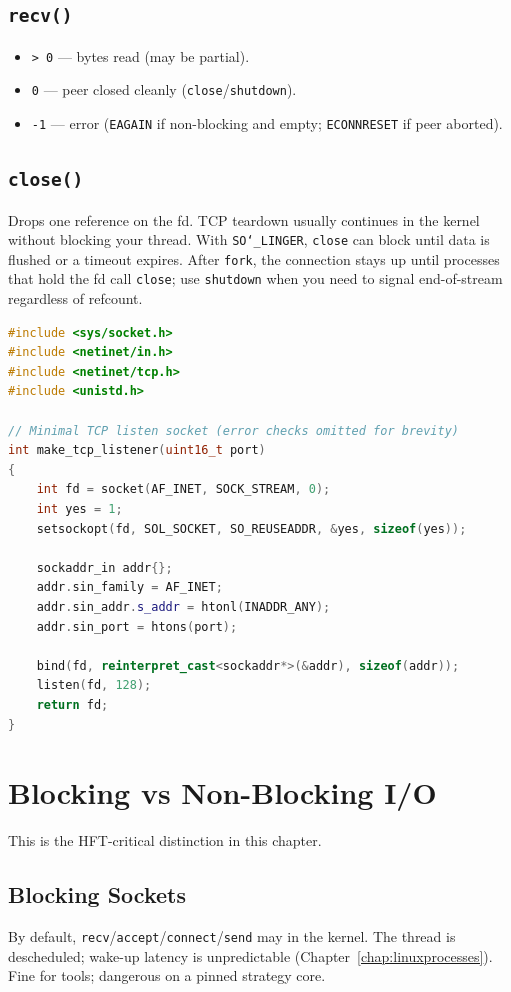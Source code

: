 \subsection{\texttt{recv()}}
\label{subsec:recv}
\begin{itemize}
    \item \texttt{> 0} --- bytes read (may be partial).
    \item \texttt{0} --- peer closed cleanly (\texttt{close}/\texttt{shutdown}).
    \item \texttt{-1} --- error (\texttt{EAGAIN} if non-blocking and empty; \texttt{ECONNRESET} if peer aborted).
\end{itemize}

\subsection{\texttt{close()}}
\label{subsec:close}
Drops one reference on the fd. TCP teardown usually continues in the kernel without 
blocking your thread. With \texttt{SO\char`_LINGER}, \texttt{close} can block until data is flushed 
or a timeout expires. After \texttt{fork}, the connection stays up until  processes 
that hold the fd call \texttt{close}; use \texttt{shutdown} when you need to signal end-of-stream 
regardless of refcount.

\begin{lstlisting}[language=C++]
#include <sys/socket.h>
#include <netinet/in.h>
#include <netinet/tcp.h>
#include <unistd.h>

// Minimal TCP listen socket (error checks omitted for brevity)
int make_tcp_listener(uint16_t port)
{
    int fd = socket(AF_INET, SOCK_STREAM, 0);
    int yes = 1;
    setsockopt(fd, SOL_SOCKET, SO_REUSEADDR, &yes, sizeof(yes));

    sockaddr_in addr{};
    addr.sin_family = AF_INET;
    addr.sin_addr.s_addr = htonl(INADDR_ANY);
    addr.sin_port = htons(port);

    bind(fd, reinterpret_cast<sockaddr*>(&addr), sizeof(addr));
    listen(fd, 128);
    return fd;
}
\end{lstlisting}

\section{Blocking vs Non-Blocking I/O}
\label{sec:blocking-vs-nonblocking-io}
This is the HFT-critical distinction in this chapter.

\subsection{Blocking Sockets}
\label{subsec:blocking-sockets}
By default, \texttt{recv}/\texttt{accept}/\texttt{connect}/\texttt{send} may  in the kernel. 
The thread is descheduled; wake-up latency is unpredictable 
(Chapter~\ref{chap:linuxprocesses}). Fine for tools; dangerous on a pinned strategy core.

